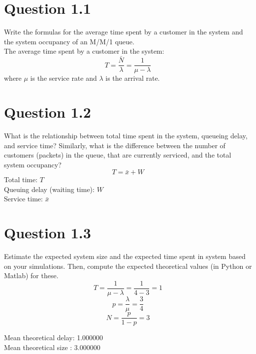\documentclass{article}
\newenvironment{homeworkProblem}[1]{
	\section*{#1}
	}{
}
\begin{document}
\newpage


\begin{homeworkProblem}{Question 1.1}
Write the formulas for the average time spent by a customer in the system and the system occupancy of an M/M/1 queue.\\

The average time spent by a customer in the system:
\begin{equation}
T = \frac{\bar{N}}{\lambda} = \frac{1}{\mu-\lambda}
\end{equation}
where $\mu$ is the service rate and $\lambda$ is the arrival rate.
\end{homeworkProblem}


\begin{homeworkProblem}{Question 1.2}
What is the relationship between total time spent in the system, queueing delay, and service time? Similarly, what is the difference between the number of customers (packets) in the queue, that are currently serviced, and the total system occupancy?\\

\begin{equation}
T = \bar{x} + W
\end{equation}
Total time: $T$\\
Queuing delay (waiting time): $W$\\
Service time: $\bar{x}$
\end{homeworkProblem}


\begin{homeworkProblem}{Question 1.3}
Estimate the expected system size and the expected time spent in system based on your simulations. Then, compute the expected theoretical values (in Python or Matlab) for these.\\

\begin{equation}
T = \frac{1}{\mu-\lambda} = \frac{1}{4-3} = 1
\end{equation}
\begin{equation}
p = \frac{\lambda}{\mu} = \frac{3}{4}
\end{equation}
\begin{equation}
N = \frac{p}{1-p} = 3
\end{equation}

Mean theoretical delay: 1.000000\\
Mean theoretical size : 3.000000
\end{homeworkProblem}
\end{document}

